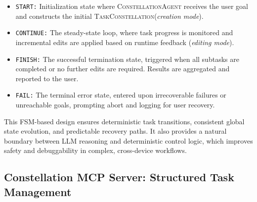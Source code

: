 \documentclass[10pt]{article} %
\newcommand{\cagent}{\textsc{ConstellationAgent}\xspace}
\newcommand{\TaskConstellation}{\textsc{TaskConstellation}\xspace}
\begin{document}
\begin{itemize}
    \item \texttt{START:} Initialization state where \cagent receives the user goal and constructs the initial \TaskConstellation (\textit{creation mode}).
    \item \texttt{CONTINUE:} The steady-state loop, where task progress is monitored and incremental edits are applied based on runtime feedback (\textit{editing mode}).
    \item \texttt{FINISH:} The successful termination state, triggered when all subtasks are completed or no further edits are required. Results are aggregated and reported to the user.
    \item \texttt{FAIL:} The terminal error state, entered upon irrecoverable failures or unreachable goals, prompting abort and logging for user recovery.
\end{itemize}

This FSM-based design ensures deterministic task transitions, consistent global state evolution, and predictable recovery paths. It also provides a natural boundary between LLM reasoning and deterministic control logic, which improves safety and debuggability in complex, cross-device workflows.

\subsection{Constellation MCP Server: Structured Task Management}
\label{subsec:mcp-server}
\end{document}
